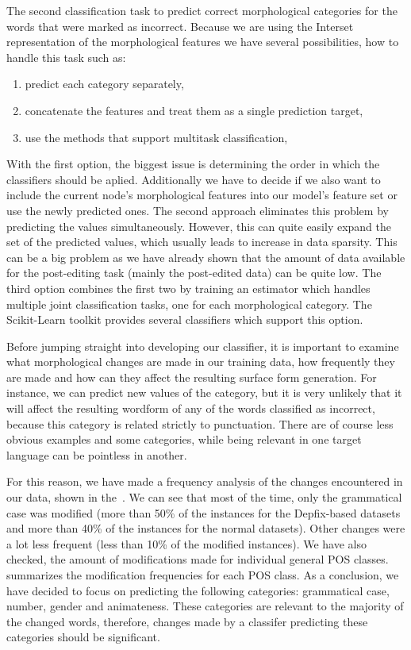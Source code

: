 The second classification task to predict correct morphological categories for
the words that were marked as incorrect. Because we are using the Interset representation
of the morphological features we have several possibilities, how to handle this task such
as:
\begin{enumerate}
    \item predict each category separately,
    \item concatenate the features and treat them as a single prediction target,
    \item use the methods that support multitask classification,
\end{enumerate}

With the first option, the biggest issue is determining the order in which the classifiers
should be aplied. Additionally we have to decide if we also want to include the current node's morphological features
into our model's feature set or use the newly predicted ones. The second approach eliminates this problem by predicting the
values simultaneously. However, this can quite easily expand the set of the predicted values,
which usually leads to increase in data sparsity. This can be a big problem as we have
already shown that the amount of data available for the post-editing task (mainly the post-edited
data) can be quite low. The third option combines the first two by training an estimator
which handles multiple joint classification tasks, one for each morphological category. The
Scikit-Learn toolkit provides several classifiers which support this option.

Before jumping straight into developing our classifier, it is important to examine what morphological
changes are made in our training data, how frequently they are made and how can they affect the resulting
surface form generation. For instance, we can predict new values of the  category,
but it is very unlikely that it will affect the resulting wordform of any of the words
classified as incorrect, because this category is related strictly to punctuation. There are
of course less obvious examples and some categories, while being relevant in one target language
can be pointless in another.

For this reason, we have made a frequency analysis of the changes encountered
in our data, shown in the~. We can see that most of the time, only the grammatical
case was modified (more than 50\% of the instances for the Depfix-based datasets and more than 40\% of the instances for
the normal datasets). Other changes were a lot less frequent (less than 10\% of the modified instances).
We have also checked, the amount of modifications made for individual general POS classes.
 summarizes the modification frequencies for each
POS class. As a conclusion, we have decided to focus on predicting the following categories: grammatical case, number, gender
and animateness. These categories are relevant to the majority of the changed words, therefore, changes made by
a classifer predicting these categories should be significant.

